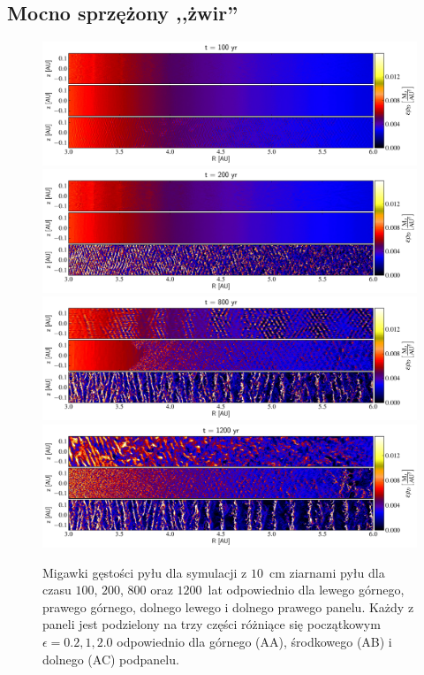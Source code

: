 \subsection{Mocno sprzężony ,,żwir''}
\begin{figure}
   \centering
   \includegraphics[width=0.99\linewidth]{figures/fig2a}
   \includegraphics[width=0.99\linewidth]{figures/fig2b}
   \includegraphics[width=0.99\linewidth]{figures/fig2c}
   \includegraphics[width=0.99\linewidth]{figures/fig2d}
   \caption{Migawki gęstości pyłu dla symulacji z $10$~cm ziarnami pyłu
      dla czasu $100$, $200$, $800$ oraz $1200$~lat odpowiednio dla lewego
      górnego, prawego górnego, dolnego lewego i dolnego prawego panelu.
      Każdy z paneli jest podzielony na trzy części różniące się początkowym 
      $\epsilon = 0.2, 1, 2.0$ odpowiednio dla górnego (AA), środkowego (AB) i
      dolnego (AC) podpanelu.}
   \label{fig2}
\end{figure}
